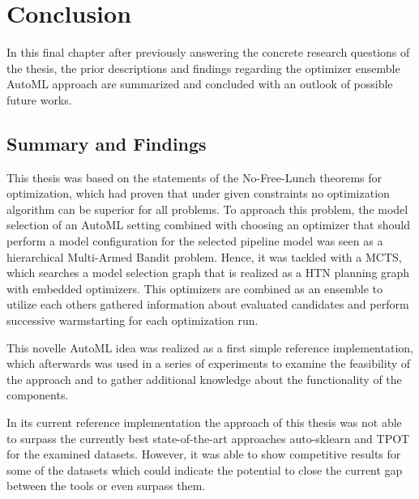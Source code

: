 %
\chapter{Conclusion}
\label{sec:conclusion}
In this final chapter after previously answering the concrete research questions of the thesis, the prior descriptions and findings regarding the optimizer ensemble AutoML approach are summarized and concluded with an outlook of possible future works.

\section{Summary and Findings}
\label{sec:conclusion:summary}
This thesis was based on the statements of the No-Free-Lunch theorems for optimization, which had proven that under given constraints no optimization algorithm can be superior for all problems.
To approach this problem, the model selection of an AutoML setting combined with choosing an optimizer that should perform a model configuration for the selected pipeline model was seen as a hierarchical Multi-Armed Bandit problem.
Hence, it was tackled with a MCTS, which searches a model selection graph that is realized as a HTN planning graph with embedded optimizers.
This optimizers are combined as an ensemble to utilize each others gathered information about evaluated candidates and perform successive warmstarting for each optimization run.

This novelle AutoML idea was realized as a first simple reference implementation, which afterwards was used in a series of experiments to examine the feasibility of the approach and to gather additional knowledge about the functionality of the components.

In its current reference implementation the approach of this thesis was not able to surpass the currently best state-of-the-art approaches auto-sklearn and TPOT for the examined datasets.
However, it was able to show competitive results for some of the datasets which could indicate the potential to close the current gap between the tools or even surpass them.

